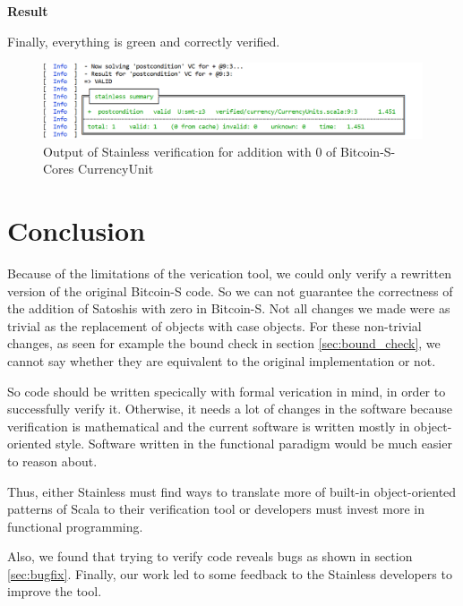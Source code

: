 \documentclass[runningheads]{llncs}
\renewcommand{\paragraph}{\textbf}%
\begin{document}
\paragraph{Result}

Finally, everything is green and correctly verified. 
\begin{figure}
	\centering
		\includegraphics[width=\textwidth]{result_output}
	\caption{Output of Stainless verification for addition with 0 of Bitcoin-S-Cores CurrencyUnit}
\end{figure}









\section{Conclusion}
\label{chap:conclusion}

Because of the limitations of the verication tool, we could only
verify a rewritten version of the original Bitcoin-S code.  So we can
not guarantee the correctness of the addition of Satoshis with zero in
Bitcoin-S.  Not all changes we made were as trivial as the replacement
of objects with case objects.  For these non-trivial changes, as seen
for example the bound check in section \ref{sec:bound_check}, we
cannot say whether they are equivalent to the original implementation
or not.

So code should be written specically with formal verication in mind,
in order to successfully verify it.  Otherwise, it needs a lot of
changes in the software because verification is mathematical and the
current software is written mostly in object-oriented style.  Software
written in the functional paradigm would be much easier to reason
about.

Thus, either Stainless must find ways to translate more of built-in
object-oriented patterns of Scala to their verification tool or
developers must invest more in functional programming.

Also, we found that trying to verify code reveals bugs as shown in
section \ref{sec:bugfix}.  Finally, our work led to some feedback to
the Stainless developers to improve the tool.
\end{document}
